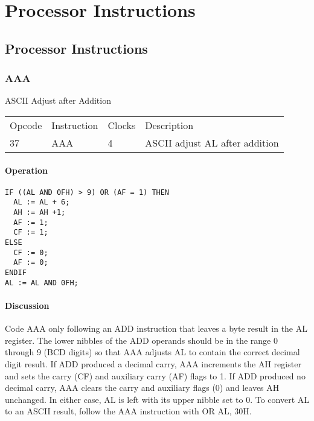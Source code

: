  

\chapter[Processor Instructions]{Processor Instructions}

\section{Processor Instructions}

\subsection*{AAA}
ASCII Adjust after Addition

\begin{tabular}{l l l l}
Opcode & Instruction & Clocks & Description\\
37 & AAA & 4 & ASCII adjust AL after addition\\
\end{tabular}

\subsubsection{Operation}
\begin{verbatim}
IF ((AL AND 0FH) > 9) OR (AF = 1) THEN
  AL := AL + 6;
  AH := AH +1;
  AF := 1;
  CF := 1;
ELSE
  CF := 0;
  AF := 0;
ENDIF
AL := AL AND 0FH;
\end{verbatim}
       
\subsubsection{Discussion}
Code AAA only following an ADD instruction that leaves a byte result in the AL register. The lower nibbles of the ADD operands should be in the range 0 through 9 (BCD digits) so that AAA adjusts AL to contain the correct decimal digit result. If ADD produced a decimal carry, AAA increments the AH register and sets the carry (CF) and auxiliary carry (AF) flags to 1. If ADD produced no decimal carry, AAA clears the carry and auxiliary flags (0) and leaves AH unchanged. In either case, AL is left with its upper nibble set to 0. To convert AL to an ASCII result, follow the AAA instruction with OR AL, 30H.

